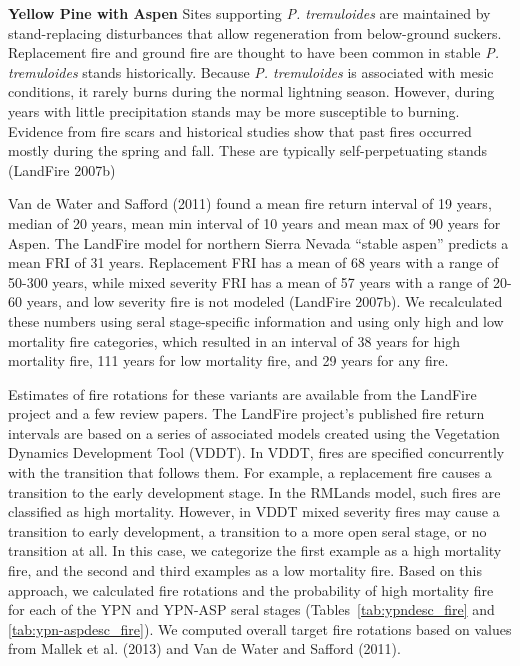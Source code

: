 \medskip
\noindent \textbf{Yellow Pine with Aspen}	Sites supporting \emph{P. tremuloides} are maintained by stand-replacing disturbances that allow regeneration from below-ground suckers. Replacement fire and ground fire are thought to have been common in stable \emph{P. tremuloides} stands historically. Because \emph{P. tremuloides} is associated with mesic conditions, it rarely burns during the normal lightning season. However, during years with little precipitation stands may be more susceptible to burning. Evidence from fire scars and historical studies show that past fires occurred mostly during the spring and fall. These are typically self-perpetuating stands (LandFire 2007b)

Van de Water and Safford (2011) found a mean fire return interval of 19 years, median of 20 years, mean min interval of 10 years and mean max of 90 years for Aspen. The LandFire model for northern Sierra Nevada ``stable aspen'' predicts a mean FRI of 31 years. Replacement FRI has a mean of 68 years with a range of 50-300 years, while mixed severity FRI has a mean of 57 years with a range of 20-60 years, and low severity fire is not modeled (LandFire 2007b). We recalculated these numbers using seral stage-specific information and using only high and low mortality fire categories, which resulted in an interval of 38 years for high mortality fire, 111 years for low mortality fire, and 29 years for any fire.

Estimates of fire rotations for these variants are available from the LandFire project and a few review papers. The LandFire project’s published fire return intervals are based on a series of associated models created using the Vegetation Dynamics Development Tool (VDDT). In VDDT, fires are specified concurrently with the transition that follows them. For example, a replacement fire causes a transition to the early development stage. In the RMLands model, such fires are classified as high mortality. However, in VDDT mixed severity fires may cause a transition to early development, a transition to a more open seral stage, or no transition at all. In this case, we categorize the first example as a high mortality fire, and the second and third examples as a low mortality fire. Based on this approach, we calculated fire rotations and the probability of high mortality fire for each of the YPN and YPN-ASP seral stages (Tables~\ref{tab:ypndesc_fire} and \ref{tab:ypn-aspdesc_fire}). We computed overall target fire rotations based on values from Mallek et al. (2013) and Van de Water and Safford (2011). 





